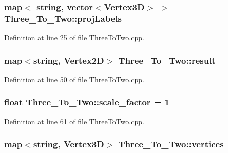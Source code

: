 \subsubsection[{\texorpdfstring{proj\+Labels}{projLabels}}]{\setlength{\rightskip}{0pt plus 5cm}map$<$ string, vector$<${\bf Vertex3D}$>$ $>$ Three\+\_\+\+To\+\_\+\+Two\+::proj\+Labels}\hypertarget{class_three___to___two_abb86c66855183ae0463c28af722997bb}{}\label{class_three___to___two_abb86c66855183ae0463c28af722997bb}


Definition at line 25 of file Three\+To\+Two.\+cpp.

\subsubsection[{\texorpdfstring{result}{result}}]{\setlength{\rightskip}{0pt plus 5cm}map$<$string, {\bf Vertex2D}$>$ Three\+\_\+\+To\+\_\+\+Two\+::result}\hypertarget{class_three___to___two_a579ed77ab975e6cfb1cf90d28074a93b}{}\label{class_three___to___two_a579ed77ab975e6cfb1cf90d28074a93b}


Definition at line 50 of file Three\+To\+Two.\+cpp.

\subsubsection[{\texorpdfstring{scale\+\_\+factor}{scale_factor}}]{\setlength{\rightskip}{0pt plus 5cm}float Three\+\_\+\+To\+\_\+\+Two\+::scale\+\_\+factor = 1}\hypertarget{class_three___to___two_a6e2169c85306e089975e4be179ab8869}{}\label{class_three___to___two_a6e2169c85306e089975e4be179ab8869}


Definition at line 61 of file Three\+To\+Two.\+cpp.

\subsubsection[{\texorpdfstring{vertices}{vertices}}]{\setlength{\rightskip}{0pt plus 5cm}map$<$string, {\bf Vertex3D}$>$ Three\+\_\+\+To\+\_\+\+Two\+::vertices}\hypertarget{class_three___to___two_a2550b425f64bae1a0f92f5405dab24b2}{}\label{class_three___to___two_a2550b425f64bae1a0f92f5405dab24b2}


